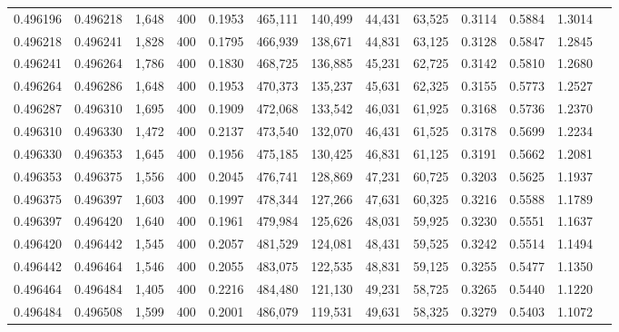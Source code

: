 \begin{tabular}{rrrrrrrrrrrrr}
0.496196 & 0.496218 &  1,648 & 400 &                                     0.1953 & 465,111 & 140,499 &  44,431 &  63,525 & 0.3114 & 0.5884 & 1.3014 \\
0.496218 & 0.496241 &  1,828 & 400 &                                     0.1795 & 466,939 & 138,671 &  44,831 &  63,125 & 0.3128 & 0.5847 & 1.2845 \\
0.496241 & 0.496264 &  1,786 & 400 &                                     0.1830 & 468,725 & 136,885 &  45,231 &  62,725 & 0.3142 & 0.5810 & 1.2680 \\
0.496264 & 0.496286 &  1,648 & 400 &                                     0.1953 & 470,373 & 135,237 &  45,631 &  62,325 & 0.3155 & 0.5773 & 1.2527 \\
0.496287 & 0.496310 &  1,695 & 400 &                                     0.1909 & 472,068 & 133,542 &  46,031 &  61,925 & 0.3168 & 0.5736 & 1.2370 \\
0.496310 & 0.496330 &  1,472 & 400 &                                     0.2137 & 473,540 & 132,070 &  46,431 &  61,525 & 0.3178 & 0.5699 & 1.2234 \\
0.496330 & 0.496353 &  1,645 & 400 &                                     0.1956 & 475,185 & 130,425 &  46,831 &  61,125 & 0.3191 & 0.5662 & 1.2081 \\
0.496353 & 0.496375 &  1,556 & 400 &                                     0.2045 & 476,741 & 128,869 &  47,231 &  60,725 & 0.3203 & 0.5625 & 1.1937 \\
0.496375 & 0.496397 &  1,603 & 400 &                                     0.1997 & 478,344 & 127,266 &  47,631 &  60,325 & 0.3216 & 0.5588 & 1.1789 \\
0.496397 & 0.496420 &  1,640 & 400 &                                     0.1961 & 479,984 & 125,626 &  48,031 &  59,925 & 0.3230 & 0.5551 & 1.1637 \\
0.496420 & 0.496442 &  1,545 & 400 &                                     0.2057 & 481,529 & 124,081 &  48,431 &  59,525 & 0.3242 & 0.5514 & 1.1494 \\
0.496442 & 0.496464 &  1,546 & 400 &                                     0.2055 & 483,075 & 122,535 &  48,831 &  59,125 & 0.3255 & 0.5477 & 1.1350 \\
0.496464 & 0.496484 &  1,405 & 400 &                                     0.2216 & 484,480 & 121,130 &  49,231 &  58,725 & 0.3265 & 0.5440 & 1.1220 \\
0.496484 & 0.496508 &  1,599 & 400 &                                     0.2001 & 486,079 & 119,531 &  49,631 &  58,325 & 0.3279 & 0.5403 & 1.1072 \\

\end{tabular}
